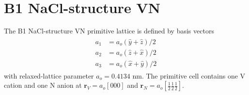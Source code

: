 \documentclass[twocolumn,showpacs,preprintnumbers,superscriptaddress,prb,floatfix,aps,10pt]{revtex4-1}
\renewcommand{\vec}[1]{\ensuremath{\mathbf{#1}}}
\begin{document}
%




\section{B1 NaCl-structure VN}

The B1 NaCl-structure VN primitive lattice is defined by basis vectors 
%
\begin{align}
\begin{split}
a_1 &= a_o (\hat{y} + \hat{z})/2 \\
a_2 &= a_o (\hat{z} + \hat{x})/2 \\ 
a_3 &= a_o (\hat{x} + \hat{y})/2	
\end{split}
\end{align}
%
with relaxed-lattice parameter $a_o = 0.4134$ nm. The primitive cell contains one V cation and one N anion at $\vec{r}_V = a_o[000]$ and $\vec{r}_N = a_o[\frac{1}{2}\frac{1}{2}\frac{1}{2}]$.  
\end{document}
